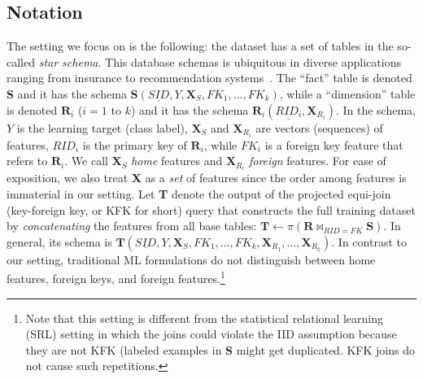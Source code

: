 \documentclass[sigconf]{acmart}
\newcommand{\eat}[1]{}
\begin{document}
\subsection{Notation}
The setting we focus on is the following: the dataset has a set of tables in the so-called \textit{star schema}. 
This database schemas is ubiquitous in diverse applications ranging from insurance to recommendation systems~\cite{cowbook}.
The ``fact'' table is denoted \textbf{S} and it has the schema $\textbf{S}(\underline{SID},Y, \textbf{X}_S, FK_1, \dots, FK_k)$,
while a ``dimension'' table is denoted $\textbf{R}_i$ ($i = 1$ to $k$) and it has the schema $\textbf{R}_i(\underline{RID_i},\textbf{X}_{R_i})$.
In the schema, $Y$ is the learning target (class label), $\textbf{X}_S$ and $\textbf{X}_{R_i}$ are vectors (sequences) of features, $RID_i$ is the primary key
of $\textbf{R}_i$, while $FK_i$ is a foreign key feature that refers to $\textbf{R}_i$. We call $\textbf{X}_S$ \textit{home} features and $\textbf{X}_{R_i}$ \textit{foreign} features.
For ease of exposition, we also treat \textbf{X} as a \textit{set} of features since the order among features is immaterial in our setting.
Let \textbf{T} denote the output of the projected equi-join (key-foreign key, or KFK for short) query that constructs the full training dataset by 
\textit{concatenating} the features from all base tables: $\textbf{T} \leftarrow \pi(\textbf{R} \bowtie_{RID=FK} \textbf{S})$. In general, its schema is 
$\textbf{T}(\underline{SID},Y,\textbf{X}_S,FK_1,\dots,FK_k,\textbf{X}_{R_1},\dots,\textbf{X}_{R_k})$.
In contrast to our setting, traditional ML formulations do not distinguish between home features, foreign keys, and foreign features.\footnote{Note that this setting is 
different from the statistical relational learning (SRL) setting in which the joins could violate the IID assumption because they are not KFK (labeled examples in \textbf{S}
might get duplicated. KFK joins do not cause such repetitions.}

\eat{
\paragraph*{Example}
Consider a common classification task for which ML classifiers are used, predicting \textit{customer churn}.
The fact table is \texttt{Customers} (\underline{\texttt{CustomerID}}, \texttt{Churn}, \texttt{Gender}, \texttt{Age}, \texttt{Employer}, \texttt{ZipCode}).
\texttt{Employer} and \texttt{Zipcode} are foreign key features that refer respectively to a customer's employer (e.g., Google or Microsoft) and the area 
where a customer lives. The respective dimension tables are \texttt{Employers} (\underline{\texttt{Employer}}, \texttt{State}, \texttt{Revenue}) 
and \texttt{Areas} (\underline{ZipCode}, \texttt{CrimeRate}, \texttt{AccidentRate}).
In such scenarios, data scientists typically join all base tables to bring in the extra features from the dimension tables. In this case, they might do so 
because of a hunch that customers employed by rich corporations in coastal states and living in ``safe'' areas are unlikely to churn.
}
\end{document}
